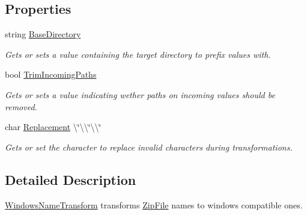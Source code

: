\subsection*{Properties}
\begin{DoxyCompactItemize}
\item 
string \hyperlink{class_i_c_sharp_code_1_1_sharp_zip_lib_1_1_zip_1_1_windows_name_transform_aa046bd418916b3953ed1ae137195e5e4}{Base\+Directory}
\begin{DoxyCompactList}\small\item\em Gets or sets a value containing the target directory to prefix values with. \end{DoxyCompactList}\item 
bool \hyperlink{class_i_c_sharp_code_1_1_sharp_zip_lib_1_1_zip_1_1_windows_name_transform_afd88be88fd031d5896080fe81a5202c1}{Trim\+Incoming\+Paths}
\begin{DoxyCompactList}\small\item\em Gets or sets a value indicating wether paths on incoming values should be removed. \end{DoxyCompactList}\item 
char \hyperlink{class_i_c_sharp_code_1_1_sharp_zip_lib_1_1_zip_1_1_windows_name_transform_abc8b8360d0688bf0e9c586110ce4ed49}{Replacement} \textbackslash{}\char`\"{}\textbackslash{}\textbackslash{}\char`\"{}\textbackslash{}\textbackslash{}\char`\"{}
\begin{DoxyCompactList}\small\item\em Gets or set the character to replace invalid characters during transformations. \end{DoxyCompactList}\end{DoxyCompactItemize}


\subsection{Detailed Description}
\hyperlink{class_i_c_sharp_code_1_1_sharp_zip_lib_1_1_zip_1_1_windows_name_transform}{Windows\+Name\+Transform} transforms \hyperlink{class_i_c_sharp_code_1_1_sharp_zip_lib_1_1_zip_1_1_zip_file}{Zip\+File} names to windows compatible ones. 



